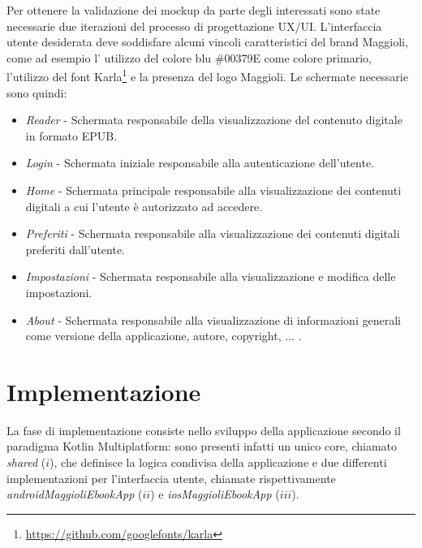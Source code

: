 Per ottenere la validazione dei mockup da parte degli interessati sono state necessarie due iterazioni del processo di progettazione UX/UI. L'interfaccia utente desiderata deve soddisfare alcuni vincoli caratteristici del brand Maggioli, come ad esempio l' utilizzo del colore blu \#00379E come colore primario, l'utilizzo del font Karla\footnote{\url{https://github.com/googlefonts/karla}} e la presenza del logo Maggioli. Le schermate necessarie sono quindi:
\begin{itemize}
    \item \textit{Reader} - Schermata responsabile della visualizzazione del contenuto digitale in formato EPUB.
    \item \textit{Login} - Schermata iniziale responsabile alla autenticazione dell'utente.
    \item \textit{Home} - Schermata principale responsabile alla visualizzazione dei contenuti digitali a cui l'utente è autorizzato ad accedere.
    \item \textit{Preferiti} - Schermata responsabile alla visualizzazione dei contenuti digitali preferiti dall'utente.
    \item \textit{Impostazioni} - Schermata responsabile alla visualizzazione e modifica delle impostazioni.
    \item \textit{About} - Schermata responsabile alla visualizzazione di informazioni generali come versione della applicazione, autore, copyright, ... .
\end{itemize}

\section{Implementazione}
La fase di implementazione consiste nello sviluppo della applicazione secondo il paradigma Kotlin Multiplatform: sono presenti infatti un unico core, chiamato \textit{shared} ($i$), che definisce la logica condivisa della applicazione e due differenti implementazioni per l'interfaccia utente, chiamate rispettivamente \textit{androidMaggioliEbookApp} ($ii$) e \textit{iosMaggioliEbookApp} ($iii$).

